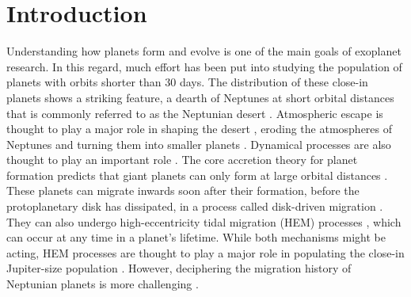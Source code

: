 \documentclass[]{aa}
\let\ACMmaketitle=\maketitle
\renewcommand{\maketitle}{\begingroup\let\footnote=\thanks \ACMmaketitle\endgroup} %
\begin{document}
   
   \maketitle

%
\section{Introduction}

Understanding how planets form and evolve is one of the main goals of exoplanet research. In this regard, much effort has been put into studying the population of planets with orbits shorter than 30 days. The distribution of these close-in planets shows a striking feature, a dearth of Neptunes at short orbital distances that is commonly referred to as the Neptunian desert \citep[]{2011A&A...528A...2B,2011ApJ...727L..44S,2011ApJ...742...38Y,2013ApJ...763...12B,2016MNRAS.455L..96H,2016NatCo...711201L,2016A&A...589A..75M}. Atmospheric escape is thought to play a major role in shaping the desert \citep[][]{2003ApJ...598L.121L,2003Natur.422..143V,2004A&A...418L...1L,2012MNRAS.425.2931O,2015AREPS..43..459T,2019AREPS..47...67O}, eroding the atmospheres of Neptunes and turning them into smaller planets \citep[e.g.][]{2011A&A...529A.136E,2014ApJ...792....1L}. Dynamical processes are also thought to play an important role \citep{2016A&A...589A..75M,2016ApJ...820L...8M,2017AJ....154..192G,2018Natur.553..477B,2018MNRAS.479.5012O,2022AJ....164..234V}. The core accretion theory for planet formation predicts that giant planets can only form at large orbital distances \citep{1996Icar..124...62P,2006ApJ...648..666R,2015ApJ...811...41L,2019ApJ...878...36L}.  These planets can migrate inwards soon after their formation, before the protoplanetary disk has dissipated, in a process called disk-driven migration \citep{1979ApJ...233..857G,1996Natur.380..606L,2016SSRv..205...77B}.  They can also undergo high-eccentricity tidal migration (HEM) processes \citep[]{2003ApJ...589..605W,2008ApJ...686..621F,2008ApJ...686..580C,2011CeMDA.111..105C,2012ApJ...751..119B}, which can occur at any time in a planet's lifetime. While both mechanisms might be acting, HEM processes are thought to play a major role in populating the close-in Jupiter-size population \citep[see][for a detailed review]{2018ARA&A..56..175D,2021JGRE..12606629F}. However, deciphering the migration history of Neptunian planets is more challenging \citep[e.g.][]{2020A&A...635A..37C}. 
\end{document}
